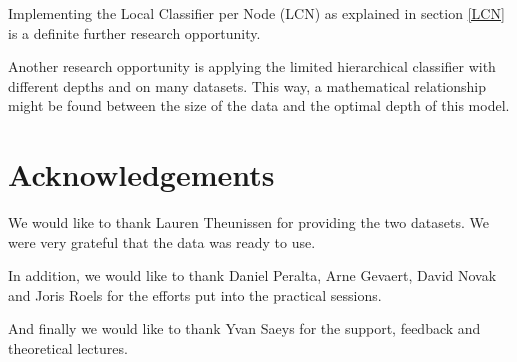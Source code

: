 \documentclass{article}
\begin{document}
Implementing the Local Classifier per Node (LCN) as explained in section \ref{LCN} is a definite further research opportunity. 

Another research opportunity is applying the limited hierarchical classifier with different depths and on many datasets. This way, a mathematical relationship might be found between the size of the data and the optimal depth of this model.

\section*{Acknowledgements}

We would like to thank Lauren Theunissen for providing the two datasets.
We were very grateful that the data was ready to use.

In addition, we would like to thank Daniel Peralta, Arne Gevaert, David Novak and Joris Roels for the efforts put into the practical sessions.

And finally we would like to thank Yvan Saeys for the support, feedback and theoretical lectures.


\nocite{hyr-types-blog}
\nocite{source1}
\nocite{source2}
\nocite{source3}
\nocite{source4}

\def\UrlBreaks{\do\/\do-}



\end{document}
